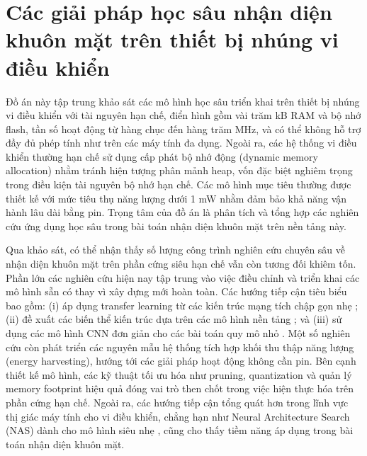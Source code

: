 \section{Các giải pháp học sâu nhận diện khuôn mặt trên thiết bị nhúng vi điều khiển}

Đồ án này tập trung khảo sát các mô hình học sâu triển khai trên thiết bị nhúng vi điều khiển với tài nguyên hạn chế, điển hình gồm vài trăm kB RAM và bộ nhớ flash, tần số hoạt động từ hàng chục đến hàng trăm MHz, và có thể không hỗ trợ đầy đủ phép tính như trên các máy tính đa dụng. Ngoài ra, các hệ thống vi điều khiển thường hạn chế sử dụng cấp phát bộ nhớ động (dynamic memory allocation) nhằm tránh hiện tượng phân mảnh heap, vốn đặc biệt nghiêm trọng trong điều kiện tài nguyên bộ nhớ hạn chế. Các mô hình mục tiêu thường được thiết kế với mức tiêu thụ năng lượng dưới 1 mW nhằm đảm bảo khả năng vận hành lâu dài bằng pin\cite{1_warden_2020_tinyml}. Trọng tâm của đồ án là phân tích và tổng hợp các nghiên cứu ứng dụng học sâu trong bài toán nhận diện khuôn mặt trên nền tảng này.

Qua khảo sát, có thể nhận thấy số lượng công trình nghiên cứu chuyên sâu về nhận diện khuôn mặt trên phần cứng siêu hạn chế vẫn còn tương đối khiêm tốn. Phần lớn các nghiên cứu hiện nay tập trung vào việc điều chỉnh và triển khai các mô hình sẵn có thay vì xây dựng mới hoàn toàn. Các hướng tiếp cận tiêu biểu bao gồm: (i) áp dụng transfer learning từ các kiến trúc mạng tích chập gọn nhẹ \cite{38_Zemlyanikin_2019_ICCV,35_10457480}; (ii) đề xuất các biến thể kiến trúc dựa trên các mô hình nền tảng \cite{37_s20216114,17_10128985}; và (iii) sử dụng các mô hình CNN đơn giản cho các bài toán quy mô nhỏ \cite{32_10.1145/3417308.3430273}. Một số nghiên cứu còn phát triển các nguyên mẫu hệ thống tích hợp khối thu thập năng lượng (energy harvesting), hướng tới các giải pháp hoạt động không cần pin. Bên cạnh thiết kế mô hình, các kỹ thuật tối ưu hóa như pruning, quantization và quản lý memory footprint hiệu quả đóng vai trò then chốt trong việc hiện thực hóa trên phần cứng hạn chế. Ngoài ra, các hướng tiếp cận tổng quát hơn trong lĩnh vực thị giác máy tính cho vi điều khiển, chẳng hạn như Neural Architecture Search (NAS) dành cho mô hình siêu nhẹ \cite{MCUNet_NEURIPS2020_86c51678}, cũng cho thấy tiềm năng áp dụng trong bài toán nhận diện khuôn mặt.

